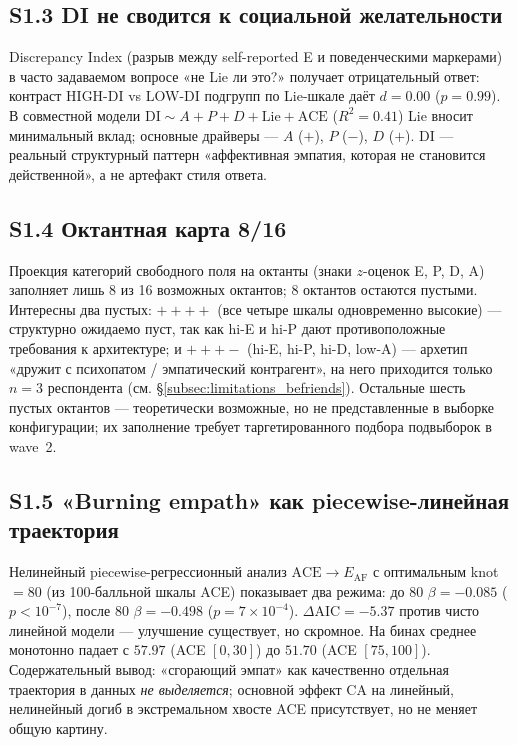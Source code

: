 \subsection*{S1.3 DI не сводится к социальной желательности}
Discrepancy Index (разрыв между self-reported E и поведенческими маркерами) в часто задаваемом вопросе «не Lie ли это?» получает отрицательный ответ: контраст HIGH-DI vs LOW-DI подгрупп по Lie-шкале даёт $d = 0.00$ ($p = 0.99$). В совместной модели $\mathrm{DI} \sim A + P + D + \mathrm{Lie} + \mathrm{ACE}$ ($R^2 = 0.41$) Lie вносит минимальный вклад; основные драйверы --- $A$ ($+$), $P$ ($-$), $D$ ($+$). DI --- реальный структурный паттерн «аффективная эмпатия, которая не становится действенной», а не артефакт стиля ответа.

\subsection*{S1.4 Октантная карта 8/16}
Проекция категорий свободного поля на октанты (знаки $z$-оценок E, P, D, A) заполняет лишь 8 из 16 возможных октантов; 8 октантов остаются пустыми. Интересны два пустых: $++++$ (все четыре шкалы одновременно высокие) --- структурно ожидаемо пуст, так как hi-E и hi-P дают противоположные требования к архитектуре; и $+++-$ (hi-E, hi-P, hi-D, low-A) --- архетип «дружит с психопатом / эмпатический контрагент», на него приходится только $n = 3$ респондента (см. §\ref{subsec:limitations_befriends}). Остальные шесть пустых октантов --- теоретически возможные, но не представленные в выборке конфигурации; их заполнение требует таргетированного подбора подвыборок в wave~2.

\subsection*{S1.5 «Burning empath» как piecewise-линейная траектория}
Нелинейный piecewise-регрессионный анализ $\mathrm{ACE} \to E_{\mathrm{AF}}$ с оптимальным knot~$= 80$ (из 100-балльной шкалы ACE) показывает два режима: до 80 $\beta = -0.085$ ($p < 10^{-7}$), после 80 $\beta = -0.498$ ($p = 7 \times 10^{-4}$). $\Delta\mathrm{AIC} = -5.37$ против чисто линейной модели --- улучшение существует, но скромное. На бинах среднее \EAF{} монотонно падает с $57.97$ (ACE $[0, 30]$) до $51.70$ (ACE $[75, 100]$). Содержательный вывод: «сгорающий эмпат» как качественно отдельная траектория в данных \emph{не выделяется}; основной эффект CA на \EAF{} линейный, нелинейный догиб в экстремальном хвосте ACE присутствует, но не меняет общую картину.

